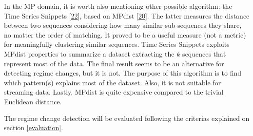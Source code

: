 \documentclass[runningheads]{llncs}
\begin{document}
In the MP domain, it is worth also mentioning other possible algorithm: the Time Series Snippets
{[}\protect\hyperlink{ref-Imani2018}{22}{]}, based on MPdist {[}\protect\hyperlink{ref-gharghabi2018b}{20}{]}. The latter measures the distance between two
sequences considering how many similar sub-sequences they share, no matter the order of matching. It
proved to be a useful measure (not a metric) for meaningfully clustering similar sequences. Time
Series Snippets exploits MPdist properties to summarize a dataset extracting the \(k\) sequences that
represent most of the data. The final result seems to be an alternative for detecting regime
changes, but it is not. The purpose of this algorithm is to find which pattern(s) explains most of
the dataset. Also, it is not suitable for streaming data. Lastly, MPdist is quite expensive compared
to the trivial Euclidean distance.

The regime change detection will be evaluated following the criterias explained on section
\ref{evaluation}.
\end{document}
